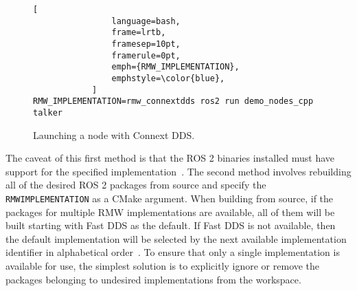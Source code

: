     \begin{figure}[thbp]
        \centering
            \begin{lstlisting}[
                language=bash,
                frame=lrtb,
                framesep=10pt,
                framerule=0pt,
                emph={RMW_IMPLEMENTATION},
                emphstyle=\color{blue},
            ]
RMW_IMPLEMENTATION=rmw_connextdds ros2 run demo_nodes_cpp talker
\end{lstlisting}
        \caption{Launching a node with Connext \ac{DDS}.}
        \label{fig:envrmw}
    \end{figure}

    The caveat of this first method is that the \ac{ROS} 2 binaries installed must have support for the specified implementation~\cite{subrmw}. The second method involves rebuilding all of the desired \ac{ROS} 2 packages from source and specify the \small\texttt{RMW\smallunderscore IMPLEMENTATION} \normalsize as a CMake argument. When building from source, if the packages for multiple \ac{RMW} implementations are available, all of them will be built starting with Fast \ac{DDS} as the default. If Fast \ac{DDS} is not available, then the default implementation will be selected by the next available implementation identifier in alphabetical order~\cite{docsdds}. To ensure that only a single implementation is available for use, the simplest solution is to explicitly ignore or remove the packages belonging to undesired implementations from the workspace.
